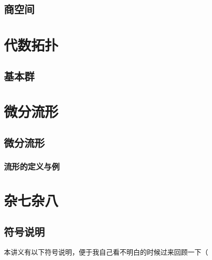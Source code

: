 \documentclass[lang=cn,10pt,device=pad]{elegantbook}
\begin{document}
\chapter{商空间}

\part{代数拓扑}
\chapter{基本群}

\part{微分流形}
\chapter{微分流形}

\section{流形的定义与例}

\part{杂七杂八}
\chapter{符号说明}
%	

本讲义有以下符号说明，便于我自己看不明白的时候过来回顾一下（
\end{document}
